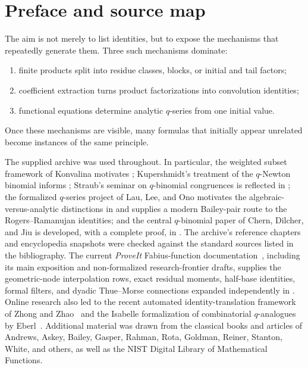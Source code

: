 \documentclass[11pt,oneside,openany]{book}
\theoremstyle{definition}
\theoremstyle{remark}
\begin{document}
\chapter*{Preface and source map}
The aim is not merely to list identities, but to expose the mechanisms that repeatedly generate them.  Three such mechanisms dominate:
\begin{enumerate}
\item finite products split into residue classes, blocks, or initial and tail factors;
\item coefficient extraction turns product factorizations into convolution identities;
\item functional equations determine analytic $q$-series from one initial value.
\end{enumerate}
Once these mechanisms are visible, many formulas that initially appear unrelated become instances of the same principle.

The supplied archive was used throughout.  In particular, the weighted subset framework of Konvalina motivates ; Kupershmidt's treatment of the $q$-Newton binomial informs ; Straub's seminar on $q$-binomial congruences is reflected in ; the formalized $q$-series project of Lau, Lee, and Ono motivates the algebraic-versus-analytic distinctions in  and supplies a modern Bailey-pair route to the Rogers--Ramanujan identities; and the central $q$-binomial paper of Chern, Dilcher, and Jiu is developed, with a complete proof, in .  The archive's reference chapters and encyclopedia snapshots were checked against the standard sources listed in the bibliography.  The current \emph{ProveIt} Fabius-function documentation~\cite{ReshetnikovProveIt2026}, including its main exposition and non-formalized research-frontier drafts, supplies the geometric-node interpolation rows, exact residual moments, half-base identities, formal filters, and dyadic Thue--Morse connections expanded independently in .  Online research also led to the recent automated identity-translation framework of Zhong and Zhao~\cite{ZhongZhao2026} and the Isabelle formalization of combinatorial $q$-analogues by Eberl~\cite{Eberl2024QAnalogues}.  Additional material was drawn from the classical books and articles of Andrews, Askey, Bailey, Gasper, Rahman, Rota, Goldman, Reiner, Stanton, White, and others, as well as the NIST Digital Library of Mathematical Functions.
\end{document}
